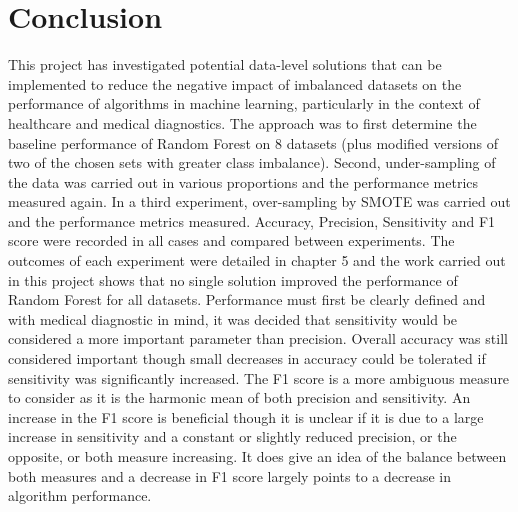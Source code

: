 \chapter{Conclusion}\label{ch:Conclusion}
This project has investigated potential data-level solutions that can be implemented to reduce the negative impact of imbalanced datasets on the performance of algorithms in machine learning, particularly in the context of healthcare and medical diagnostics.\newline
The approach was to first determine the baseline performance of Random Forest on 8 datasets (plus modified versions of two of the chosen sets with greater class imbalance). Second, under-sampling of the data was carried out in various proportions and the performance metrics measured again. In a third experiment, over-sampling by SMOTE was carried out and the performance metrics measured. Accuracy, Precision, Sensitivity and F1 score were recorded in all cases and compared between experiments.
The outcomes of each experiment were detailed in chapter 5 and the work carried out in this project shows that no single solution improved the performance of Random Forest for all datasets.\newline
Performance must first be clearly defined and with medical diagnostic in mind, it was decided that sensitivity would be considered a more important parameter than precision. Overall accuracy was still considered important though small decreases in accuracy could be tolerated if sensitivity was significantly increased. The F1 score is a more ambiguous measure to consider as it is the harmonic mean of both precision and sensitivity. An increase in the F1 score is beneficial though it is unclear if it is due to a large increase in sensitivity and a constant or slightly reduced precision, or the opposite, or both measure increasing. It does give an idea of the balance between both measures and a decrease in F1 score largely points to a decrease in algorithm performance.\newline

